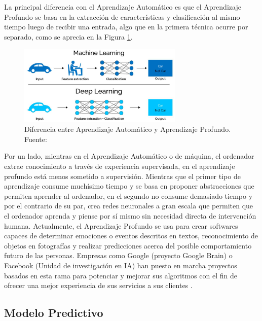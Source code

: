 La principal diferencia con el Aprendizaje Automático es que el Aprendizaje Profundo se basa en la extracción de características y clasificación al mismo tiempo luego de recibir una entrada, algo que en la primera técnica ocurre por separado, como se aprecia en la Figura \ref{2:fig5}.
\begin{figure}[!ht]
	\begin{center}
		\includegraphics[width=0.70\textwidth]{2/figures/deeplearning_machinelearning.jpg}
		\caption[Diferencia entre Aprendizaje Automático y Aprendizaje Profundo]{Diferencia entre Aprendizaje Automático y Aprendizaje Profundo. Fuente: \cite{tec_cook2018deeplearning}}
		\label{2:fig5}
	\end{center}
\end{figure}

Por un lado, mientras en el Aprendizaje Automático o de máquina, el ordenador extrae conocimiento a través de experiencia supervisada, en el aprendizaje profundo está menos sometido a supervisión. Mientras que el primer tipo de aprendizaje consume muchísimo tiempo y se basa en proponer abstracciones que permiten aprender al ordenador, en el segundo no consume demasiado tiempo y por el contrario de su par, crea redes neuronales a gran escala que permiten que el ordenador aprenda y piense por sí mismo sin necesidad directa de intervención humana. Actualmente, el Aprendizaje Profundo se usa para crear softwares capaces de determinar emociones o eventos descritos en textos, reconocimiento de objetos en fotografías y realizar predicciones acerca del posible comportamiento futuro de las personas. Empresas como Google (proyecto Google Brain) o Facebook (Unidad de investigación en IA) han puesto en marcha proyectos basados en esta rama para potenciar y mejorar sus algoritmos con el fin de ofrecer una mejor experiencia de sus servicios a sus clientes \parencite{tec_banafa2019deeplearning}.

\subsection{Modelo Predictivo}

